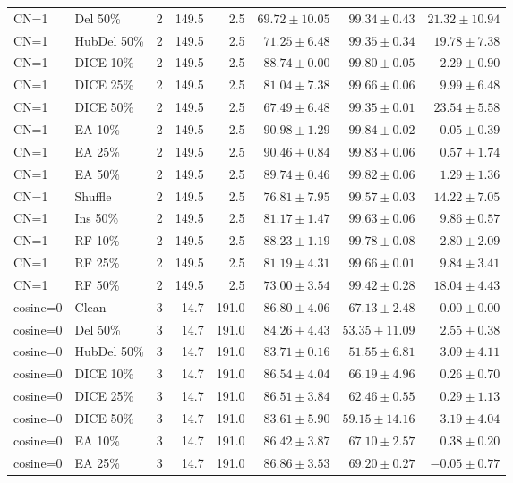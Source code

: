 {\begin{longtable}{llrrrrrr}
CN=1 & Del 50\% & 2 & 149.5 & 2.5 & $69.72\pm10.05$ & $99.34\pm0.43$ & $21.32\pm10.94$ \\
CN=1 & HubDel 50\% & 2 & 149.5 & 2.5 & $71.25\pm6.48$ & $99.35\pm0.34$ & $19.78\pm7.38$ \\
CN=1 & DICE 10\% & 2 & 149.5 & 2.5 & $88.74\pm0.00$ & $99.80\pm0.05$ & $2.29\pm0.90$ \\
CN=1 & DICE 25\% & 2 & 149.5 & 2.5 & $81.04\pm7.38$ & $99.66\pm0.06$ & $9.99\pm6.48$ \\
CN=1 & DICE 50\% & 2 & 149.5 & 2.5 & $67.49\pm6.48$ & $99.35\pm0.01$ & $23.54\pm5.58$ \\
CN=1 & EA 10\% & 2 & 149.5 & 2.5 & $90.98\pm1.29$ & $99.84\pm0.02$ & $0.05\pm0.39$ \\
CN=1 & EA 25\% & 2 & 149.5 & 2.5 & $90.46\pm0.84$ & $99.83\pm0.06$ & $0.57\pm1.74$ \\
CN=1 & EA 50\% & 2 & 149.5 & 2.5 & $89.74\pm0.46$ & $99.82\pm0.06$ & $1.29\pm1.36$ \\
CN=1 & Shuffle & 2 & 149.5 & 2.5 & $76.81\pm7.95$ & $99.57\pm0.03$ & $14.22\pm7.05$ \\
CN=1 & Ins 50\% & 2 & 149.5 & 2.5 & $81.17\pm1.47$ & $99.63\pm0.06$ & $9.86\pm0.57$ \\
CN=1 & RF 10\% & 2 & 149.5 & 2.5 & $88.23\pm1.19$ & $99.78\pm0.08$ & $2.80\pm2.09$ \\
CN=1 & RF 25\% & 2 & 149.5 & 2.5 & $81.19\pm4.31$ & $99.66\pm0.01$ & $9.84\pm3.41$ \\
CN=1 & RF 50\% & 2 & 149.5 & 2.5 & $73.00\pm3.54$ & $99.42\pm0.28$ & $18.04\pm4.43$ \\
cosine=0 & Clean & 3 & 14.7 & 191.0 & $86.80\pm4.06$ & $67.13\pm2.48$ & $0.00\pm0.00$ \\
cosine=0 & Del 50\% & 3 & 14.7 & 191.0 & $84.26\pm4.43$ & $53.35\pm11.09$ & $2.55\pm0.38$ \\
cosine=0 & HubDel 50\% & 3 & 14.7 & 191.0 & $83.71\pm0.16$ & $51.55\pm6.81$ & $3.09\pm4.11$ \\
cosine=0 & DICE 10\% & 3 & 14.7 & 191.0 & $86.54\pm4.04$ & $66.19\pm4.96$ & $0.26\pm0.70$ \\
cosine=0 & DICE 25\% & 3 & 14.7 & 191.0 & $86.51\pm3.84$ & $62.46\pm0.55$ & $0.29\pm1.13$ \\
cosine=0 & DICE 50\% & 3 & 14.7 & 191.0 & $83.61\pm5.90$ & $59.15\pm14.16$ & $3.19\pm4.04$ \\
cosine=0 & EA 10\% & 3 & 14.7 & 191.0 & $86.42\pm3.87$ & $67.10\pm2.57$ & $0.38\pm0.20$ \\
cosine=0 & EA 25\% & 3 & 14.7 & 191.0 & $86.86\pm3.53$ & $69.20\pm0.27$ & $-0.05\pm0.77$ \\

\end{longtable}}

